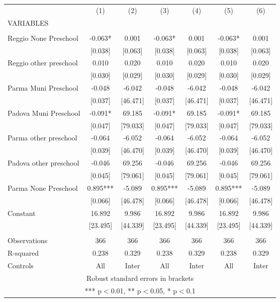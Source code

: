 \begin{tabular}{lcccccc} \hline
 & (1) & (2) & (3) & (4) & (5) & (6) \\
VARIABLES &  &  &  &  &  &  \\ \hline
 &  &  &  &  &  &  \\
Reggio None Preschool & -0.063* & 0.001 & -0.063* & 0.001 & -0.063* & 0.001 \\
 & [0.038] & [0.063] & [0.038] & [0.063] & [0.038] & [0.063] \\
Reggio other preschool & 0.010 & 0.020 & 0.010 & 0.020 & 0.010 & 0.020 \\
 & [0.030] & [0.029] & [0.030] & [0.029] & [0.030] & [0.029] \\
Parma Muni Preschool & -0.048 & -6.042 & -0.048 & -6.042 & -0.048 & -6.042 \\
 & [0.037] & [46.471] & [0.037] & [46.471] & [0.037] & [46.471] \\
Padova Muni Preschool & -0.091* & 69.185 & -0.091* & 69.185 & -0.091* & 69.185 \\
 & [0.047] & [79.033] & [0.047] & [79.033] & [0.047] & [79.033] \\
Parma other preschool & -0.064 & -6.052 & -0.064 & -6.052 & -0.064 & -6.052 \\
 & [0.039] & [46.470] & [0.039] & [46.470] & [0.039] & [46.470] \\
Padova other preschool & -0.046 & 69.256 & -0.046 & 69.256 & -0.046 & 69.256 \\
 & [0.045] & [79.061] & [0.045] & [79.061] & [0.045] & [79.061] \\
Parma None Preschool & 0.895*** & -5.089 & 0.895*** & -5.089 & 0.895*** & -5.089 \\
 & [0.066] & [46.478] & [0.066] & [46.478] & [0.066] & [46.478] \\
Constant & 16.892 & 9.986 & 16.892 & 9.986 & 16.892 & 9.986 \\
 & [23.495] & [44.339] & [23.495] & [44.339] & [23.495] & [44.339] \\
 &  &  &  &  &  &  \\
Observations & 366 & 366 & 366 & 366 & 366 & 366 \\
R-squared & 0.238 & 0.329 & 0.238 & 0.329 & 0.238 & 0.329 \\
 Controls & All & Inter & All & Inter & All & Inter \\ \hline
\multicolumn{7}{c}{ Robust standard errors in brackets} \\
\multicolumn{7}{c}{ *** p$<$0.01, ** p$<$0.05, * p$<$0.1} \\
\end{tabular}
